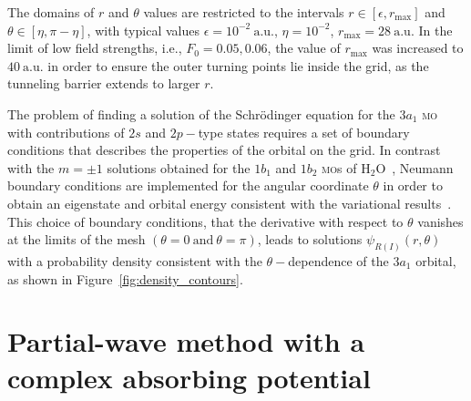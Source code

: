 The domains of $r$ and $\theta$ values are restricted to the intervals
$r\in[\epsilon, r_{\mathrm{max}}]$ and $\theta\in[\eta,\pi-\eta]$,
with typical values $\epsilon = 10^{-2}\ \mathrm{a.u.}$, $\eta =
10^{-2}$, $r_{\mathrm{max}} = 28\ \mathrm{a.u.}$ In the limit of low
field strengths, i.e., $F_{0} = 0.05, 0.06$, the value of
$r_{\mathrm{max}}$ was increased to $40\ \mathrm{a.u.}$ in order to
ensure the outer turning points lie inside the grid, as the tunneling
barrier extends to larger $r$.

The problem of finding a solution of the Schr\"{o}dinger equation for
the $3a_{1}$ \textsc{mo} with contributions of $2s$ and $2p-$type
states requires a set of boundary conditions that describes the
properties of the orbital on the grid. In contrast with the $m = \pm
1$ solutions obtained for the $1b_{1}$ and $1b_{2}$ \textsc{mo}s of
H$_{2}$O~\cite{sarias_2016}, Neumann boundary conditions are
implemented for the angular coordinate $\theta$ in order to obtain an
eigenstate and orbital energy consistent with the variational
results~\cite{Moccia_1964}. This choice of boundary conditions, that
the derivative with respect to $\theta$ vanishes at the limits of the
mesh $(\theta = 0 ~\mathrm{and}~ \theta = \pi)$, leads to solutions
$\psi_{R(I)}(r,\theta)$ with a probability density consistent with the
$\theta-$dependence of the $3a_{1}$ orbital, as shown in
Figure~\ref{fig:density_contours}.



\section{Partial-wave method with a complex absorbing potential}
\label{ch:partial_wave}







